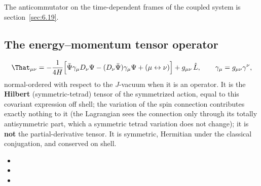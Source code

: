 The anticommutator on the time-dependent frames of the coupled system is section~\ref{sec:6.19}.

\subsection{The energy--momentum tensor operator}
\label{sec:3.5}

\[
  \That_{\mu\nu}=-\frac{1}{4H}\Bigl[\bar\Psi\gamma_\mu D_\nu\Psi-(D_\nu\bar\Psi)\gamma_\mu\Psi+(\mu\leftrightarrow\nu)\Bigr]
  +g_{\mu\nu}\,\hat L,\qquad \gamma_\mu=g_{\mu\nu}\gamma^\nu ,
\]
normal-ordered with respect to the $J$-vacuum when it is an operator. It is the \textbf{Hilbert}
(symmetric-tetrad) tensor of the symmetrized action, equal to this covariant expression off shell; the
variation of the spin connection contributes exactly nothing to it (the Lagrangian sees the connection
only through its totally antisymmetric part, which a symmetric tetrad variation does not change); it is
\textbf{not} the partial-derivative tensor. It is symmetric, Hermitian under the classical conjugation,
and conserved on shell. 
\begin{itemize}
  \item {}
  \item {}
  \item {}
\end{itemize}

